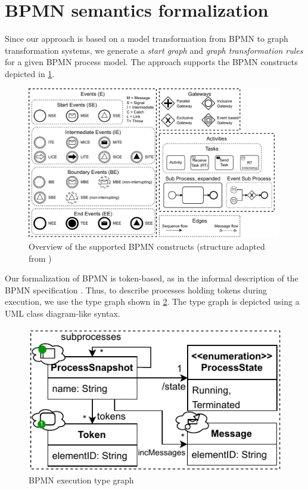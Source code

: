 \documentclass[submission, copyright, creativecommons]{eptcs}
\begin{document}
\section{BPMN semantics formalization} \label{sec:formalization}

Since our approach is based on a model transformation from BPMN to graph transformation systems, we generate a \emph{start graph} and \emph{graph transformation rules} for a given BPMN process model.
The approach supports the BPMN constructs depicted in \cref{fig:bpmnConstructsOverview}.

\begin{figure}[h]
    \centering
    \includegraphics[width=0.99\textwidth]{images/bpmn_semantics-feature-overview.pdf}
    \caption{Overview of the supported BPMN constructs (structure adapted from \cite{houhouFirstOrderLogicVerification2022})}
    \label{fig:bpmnConstructsOverview}
\end{figure}

Our formalization of BPMN is token-based, as in the informal description of the BPMN specification \cite{objectmanagementgroupBusinessProcessModel2013}.
Thus, to describe processes holding tokens during execution, we use the type graph shown in \cref{fig:typeGraph}.
The type graph is depicted using a UML class diagram-like syntax.

\begin{figure}
  \centering
  \includegraphics[width=0.5\linewidth]{images/bpmn_semantics-typegraph.pdf}
  \caption{BPMN execution type graph}
  \label{fig:typeGraph}
\end{figure}
\end{document}
